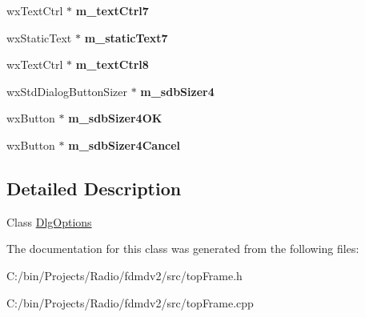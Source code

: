 \begin{DoxyCompactItemize}
\item 
\hypertarget{class_dlg_options_adba9ce87076479d390d32932f5c71a7c}{wx\-Text\-Ctrl $\ast$ {\bfseries m\-\_\-text\-Ctrl7}}\label{class_dlg_options_adba9ce87076479d390d32932f5c71a7c}

\item 
\hypertarget{class_dlg_options_a1d6d4b2a70e0eb5d1a998da2e5ea86c0}{wx\-Static\-Text $\ast$ {\bfseries m\-\_\-static\-Text7}}\label{class_dlg_options_a1d6d4b2a70e0eb5d1a998da2e5ea86c0}

\item 
\hypertarget{class_dlg_options_acaed1591a5e35a2750f610644cc90f29}{wx\-Text\-Ctrl $\ast$ {\bfseries m\-\_\-text\-Ctrl8}}\label{class_dlg_options_acaed1591a5e35a2750f610644cc90f29}

\item 
\hypertarget{class_dlg_options_ab71c6ceea19ba3ba907aa7d1d3a5a63d}{wx\-Std\-Dialog\-Button\-Sizer $\ast$ {\bfseries m\-\_\-sdb\-Sizer4}}\label{class_dlg_options_ab71c6ceea19ba3ba907aa7d1d3a5a63d}

\item 
\hypertarget{class_dlg_options_a7d0b24d52fdb25871dc30640f1027a51}{wx\-Button $\ast$ {\bfseries m\-\_\-sdb\-Sizer4\-O\-K}}\label{class_dlg_options_a7d0b24d52fdb25871dc30640f1027a51}

\item 
\hypertarget{class_dlg_options_ae99c4b9abc19085e47108d6f8db704c6}{wx\-Button $\ast$ {\bfseries m\-\_\-sdb\-Sizer4\-Cancel}}\label{class_dlg_options_ae99c4b9abc19085e47108d6f8db704c6}

\end{DoxyCompactItemize}


\subsection{Detailed Description}
Class \hyperlink{class_dlg_options}{Dlg\-Options} 

The documentation for this class was generated from the following files\-:\begin{DoxyCompactItemize}
\item 
C\-:/bin/\-Projects/\-Radio/fdmdv2/src/top\-Frame.\-h\item 
C\-:/bin/\-Projects/\-Radio/fdmdv2/src/top\-Frame.\-cpp\end{DoxyCompactItemize}
